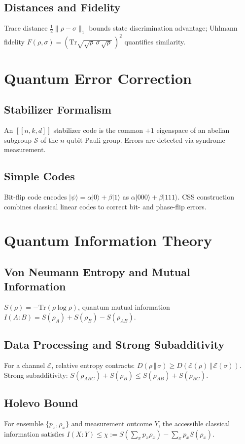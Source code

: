 \documentclass[11pt]{article}
\theoremstyle{definition}
\newcommand{\ket}[1]{\lvert #1 \rangle}
\newcommand{\Tr}{\mathrm{Tr}}
\begin{document}
\subsection{Distances and Fidelity}
Trace distance $\tfrac{1}{2}\lVert \rho-\sigma\rVert_1$ bounds state discrimination advantage; Uhlmann fidelity $F(\rho,\sigma)=\left(\Tr\sqrt{\sqrt{\rho}\,\sigma\,\sqrt{\rho}}\,\right)^2$ quantifies similarity.

\section{Quantum Error Correction}

\subsection{Stabilizer Formalism}
An $[[n,k,d]]$ stabilizer code is the common $+1$ eigenspace of an abelian subgroup $\mathcal{S}$ of the $n$-qubit Pauli group. Errors are detected via syndrome measurement.

\subsection{Simple Codes}
Bit-flip code encodes $\ket{\psi}=\alpha\ket{0}+\beta\ket{1}$ as $\alpha\ket{000}+\beta\ket{111}$. CSS construction combines classical linear codes to correct bit- and phase-flip errors.

\section{Quantum Information Theory}

\subsection{Von Neumann Entropy and Mutual Information}
$S(\rho)=-\Tr(\rho\log\rho)$, quantum mutual information $I(A:B)=S(\rho_A)+S(\rho_B)-S(\rho_{AB})$.

\subsection{Data Processing and Strong Subadditivity}
For a channel $\mathcal{E}$, relative entropy contracts: $D(\rho\,\Vert\,\sigma) \ge D(\mathcal{E}(\rho)\,\Vert\,\mathcal{E}(\sigma))$. Strong subadditivity: $S(\rho_{ABC})+S(\rho_B)\le S(\rho_{AB})+S(\rho_{BC})$.

\subsection{Holevo Bound}
For ensemble $\{p_x,\rho_x\}$ and measurement outcome $Y$, the accessible classical information satisfies $I(X:Y)\le \chi := S\!\left(\sum_x p_x\rho_x\right)-\sum_x p_x S(\rho_x)$.
\end{document}
